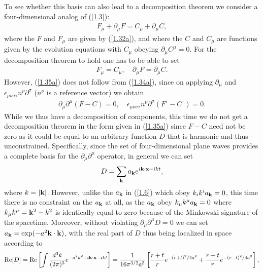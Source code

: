 To see whether this basis can also lead to a decomposition theorem we consider a four-dimensional analog of (\ref{1.3}): 
%
\begin{eqnarray}
F_{\mu}+\partial_{\mu}F=C_{\mu}+\partial_{\mu}C,
\label{1.34a}
\end{eqnarray}
%
where the $F$ and $F_{\mu}$ are given by (\ref{1.32a}), and where the $C$ and $C_{\mu}$ are functions given by the evolution equations with $C_{\mu}$ obeying  $\partial_{\mu}C^{\mu}=0$. For the decomposition theorem to hold one has to be able to set
%
\begin{eqnarray}
F_{\mu}= C_{\mu},\quad \partial_{\mu}F=\partial_{\mu}C.
\label{1.35a}
\end{eqnarray}
%
However, (\ref{1.35a}) does not follow from (\ref{1.34a}), since on applying $\partial_{\mu}$  and $\epsilon_{\mu\nu\sigma\tau}n^{\nu}\partial^{\sigma}$ ($n^{\nu}$ is a reference vector) we obtain
%
\begin{eqnarray}
\partial_{\mu}\partial^{\mu}(F-C)=0,\quad \epsilon_{\mu\nu\sigma\tau}n^{\nu}\partial^{\sigma}(F^{\tau}-C^{\tau})=0.
\label{1.36a}
\end{eqnarray}
%
While we thus have a decomposition of components, this time we do not get a decomposition theorem in the form given in (\ref{1.35a}) since $F-C$ need not be zero as it could  be equal to an arbitrary function $D$ that is harmonic and thus unconstrained. Specifically, since the set of four-dimensional plane waves provides a complete basis for the $\partial_{\mu}\partial^{\mu}$ operator, in general we can set  
%
\begin{eqnarray}
D=\sum _{\bf k}a_{\bf k}e^{i\textbf{k}\cdot \textbf{x}-ikt},
\label{1.37a}
\end{eqnarray}
%
where $k=|{\bf k}|$. However, unlike the $a_{\bf k}$ in (\ref{1.6}) which obey $k_ik^ia_{\bf k}=0$, this time there is no constraint on the $a_{\bf k}$ at all, as the $a_{\bf k}$ obey $k_{\mu}k^{\mu}a_{\bf k}=0$ where $k_{\mu}k^{\mu}={\bf k}^2-k^2$ is identically equal to zero because of the Minkowski signature of the spacetime. Moreover, without violating $\partial_{\mu}\partial^{\mu}D=0$ we can set $a_{\bf k}=\exp(-a^2{\bf k}\cdot{\bf k})$, with the real part of $D$ thus being localized in space according to
%
\begin{eqnarray}
{\rm Re}[D]={\rm Re}\left[\int \frac{d^3k}{(2\pi)^3}e^{-a^2k^2+i\textbf{k}\cdot \textbf{x}-ikt}\right]=
\frac{1}{16\pi^{3/2}a^3}\left[\frac{r+t}{r}e^{-(r+t)^2/4a^2}+\frac{r-t}{r}e^{-(r-t)^2/4a^2}\right],
\label{1.38a}
\end{eqnarray}

